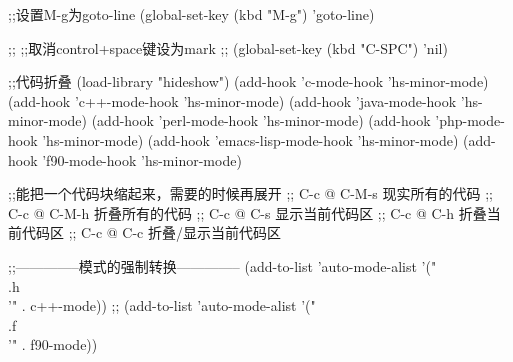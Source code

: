 \begin{emacscode}
;;设置M-g为goto-line
(global-set-key (kbd "M-g") 'goto-line)

;; ;;取消control+space键设为mark
;; (global-set-key (kbd "C-SPC") 'nil)

;;代码折叠
(load-library "hideshow")
(add-hook 'c-mode-hook 'hs-minor-mode)
(add-hook 'c++-mode-hook 'hs-minor-mode)
(add-hook 'java-mode-hook 'hs-minor-mode)
(add-hook 'perl-mode-hook 'hs-minor-mode)
(add-hook 'php-mode-hook 'hs-minor-mode)
(add-hook 'emacs-lisp-mode-hook 'hs-minor-mode)
(add-hook 'f90-mode-hook 'hs-minor-mode)

;;能把一个代码块缩起来，需要的时候再展开
;; C-c @ C-M-s 现实所有的代码
;; C-c @ C-M-h 折叠所有的代码
;; C-c @ C-s   显示当前代码区
;; C-c @ C-h   折叠当前代码区
;; C-c @ C-c   折叠/显示当前代码区


;;--------------模式的强制转换--------------
(add-to-list 'auto-mode-alist '("\\.h\\'" . c++-mode))
;; (add-to-list 'auto-mode-alist '("\\.f\\'" . f90-mode))

\end{emacscode}



